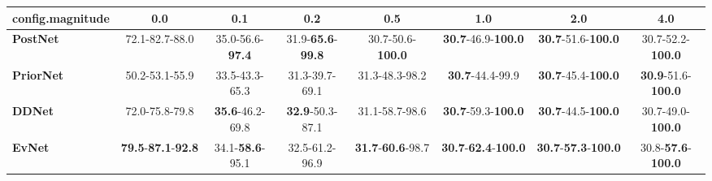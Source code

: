 \begin{tabular}{lccccccc}
\toprule
\textbf{config.magnitude} &                                        0.0 &                      0.1 &                               0.2 &                               0.5 &                                         1.0 &                                         2.0 &                                4.0 \\
\midrule
\textbf{PostNet } &                             72.1-82.7-88.0 &  35.0-56.6-\textbf{97.4} &  31.9-\textbf{65.6}-\textbf{99.8} &          30.7-50.6-\textbf{100.0} &           \textbf{30.7}-46.9-\textbf{100.0} &           \textbf{30.7}-51.6-\textbf{100.0} &           30.7-52.2-\textbf{100.0} \\
\textbf{PriorNet} &                             50.2-53.1-55.9 &           33.5-43.3-65.3 &                    31.3-39.7-69.1 &                    31.3-48.3-98.2 &                     \textbf{30.7}-44.4-99.9 &           \textbf{30.7}-45.4-\textbf{100.0} &  \textbf{30.9}-51.6-\textbf{100.0} \\
\textbf{DDNet   } &                             72.0-75.8-79.8 &  \textbf{35.6}-46.2-69.8 &           \textbf{32.9}-50.3-87.1 &                    31.1-58.7-98.6 &           \textbf{30.7}-59.3-\textbf{100.0} &           \textbf{30.7}-44.5-\textbf{100.0} &           30.7-49.0-\textbf{100.0} \\
\textbf{EvNet   } &  \textbf{79.5}-\textbf{87.1}-\textbf{92.8} &  34.1-\textbf{58.6}-95.1 &                    32.5-61.2-96.9 &  \textbf{31.7}-\textbf{60.6}-98.7 &  \textbf{30.7}-\textbf{62.4}-\textbf{100.0} &  \textbf{30.7}-\textbf{57.3}-\textbf{100.0} &  30.8-\textbf{57.6}-\textbf{100.0} \\
\bottomrule
\end{tabular}
